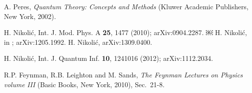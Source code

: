 \documentclass[12pt]{article}
\begin{document}
\begin{thebibliography}{99}
A. Peres, {\it Quantum Theory: Concepts and Methods} (Kluwer Academic Publishers, New York, 2002).

H. Nikoli\'c, Int. J. Mod. Phys. A {\bf 25}, 1477 (2010); arXiv:0904.2287.
￼
H. Nikoli\'c, in \cite{oriols}; arXiv:1205.1992.
H. Nikoli\'c, arXiv:1309.0400.

H. Nikoli\'c, Int. J. Quantum Inf. {\bf 10}, 1241016 (2012); arXiv:1112.2034.

R.P. Feynman, R.B. Leighton and M. Sands, 
{\it The Feynman Lectures on Physics volume III} (Basic Books, New York, 2010), Sec.~21-8.


\end{thebibliography}
\end{document}

